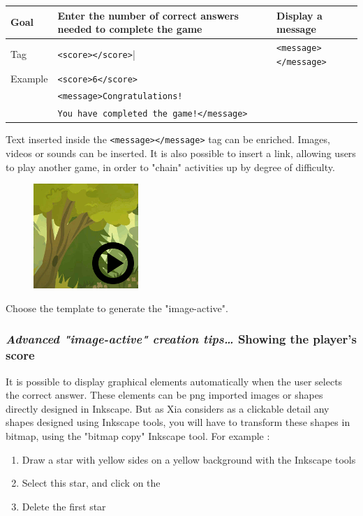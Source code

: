  \begin{tabular}{|l|p{2in}|p{2in}|}
 \hline
  Goal & Enter the number of correct answers needed to complete the game & Display a message\\
  \hline
  Tag & \texttt{<score></score>}| & \texttt{<message></message>}\\
  \hline
  Example & \multicolumn{2}{|l|}{\texttt{<score>6</score>}}\\
   & \multicolumn{2}{|l|}{\texttt{<message>Congratulations!}}\\
    & \multicolumn{2}{|l|}{\texttt{You have completed the game!</message>}}\\
  \hline
 \end{tabular}

 
\begin{astuce}
Text inserted inside the \verb|<message></message>| tag can be 
enriched. Images, videos or sounds can be inserted.
It is also possible to insert a link, allowing users to play another game,
in order to "chain" activities up by degree of difficulty.
\end{astuce}

\begin{figure}
  \centering
  \includegraphics[scale=0.7]{./images/game1clic} 
\end{figure}

Choose the template  to generate the "image-active".


\subsubsection{\emph{Advanced "image-active" creation tips\ldots} Showing the player's score}\label{détail_progression}


It is possible to display graphical elements automatically  when the user 
selects the correct answer. These elements can be png imported images or shapes directly designed in
Inkscape.
But as Xia considers as a clickable 
detail any shapes designed using Inkscape tools, you 
will have to transform these shapes in bitmap, using the "bitmap copy" Inkscape tool. 
For example :
\begin{enumerate}
 \item Draw  a star with yellow sides on a yellow background with the Inkscape tools 
 \item Select this star, and click on the 
 \item Delete the first star
\end{enumerate}

